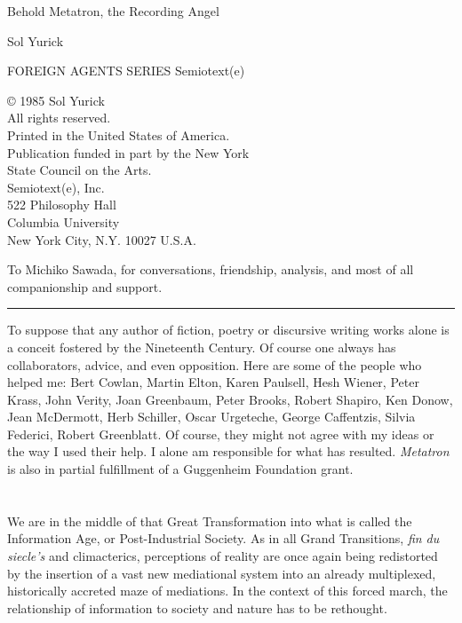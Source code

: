 \documentclass[11pt,twoside,draft]{memoir}
\newcommand{\titlePageTitle}[1]{ 
{ \Large #1 }}
\newcommand{\titlePageAuthor}[1]{ 
{ \large #1 }}
\begin{document}

{
	\raggedright
\titlePageTitle{Behold Metatron, the Recording Angel} \linebreak
\titlePageAuthor{Sol Yurick} \par
}

\clearpage 


{
FOREIGN AGENTS SERIES
Semiotext(e)

© 1985 Sol Yurick \\
All rights reserved. \\
Printed in the United States of America. \\
Publication funded in part by the New York \\
State Council on the Arts. \\

Semiotext(e), Inc.\\

522 Philosophy Hall \\
Columbia University \\
New York City, N.Y. 10027 U.S.A. 
}

\clearpage

{
	To Michiko Sawada, for conversations, friendship, analysis, and most of all companionship and support.

\plainbreak{2}

To suppose that any author of fiction, poetry or discursive writing works alone is a conceit fostered by the Nineteenth Century. Of course one always has collaborators, advice, and even opposition. Here are some of the people who helped me: Bert Cowlan, Martin Elton, Karen Paulsell, Hesh Wiener, Peter Krass, John Verity, Joan Greenbaum, Peter Brooks, Robert Shapiro, Ken Donow, Jean McDermott, Herb Schiller, Oscar Urgeteche, George Caffentzis, Silvia Federici, Robert Greenblatt. Of course, they might not agree with my ideas or the way I used their help. I alone am responsible for what has resulted. \emph{Metatron} is also in partial fulfillment of a Guggenheim Foundation grant.
}

\clearpage

\mainmatter
{}
\openany
\pagestyle{simple}

\chapter{}

We are in the middle of that Great Transformation into what is called the Information Age, or Post-Industrial Society. As in all Grand Transitions, \emph{fin du siecle's} and climacterics, perceptions of reality are once again being redistorted by the insertion of a vast new mediational system into an already multiplexed, historically accreted maze of mediations. In the context of this forced march, the relationship of information to society and nature has to be rethought.
\end{document}

